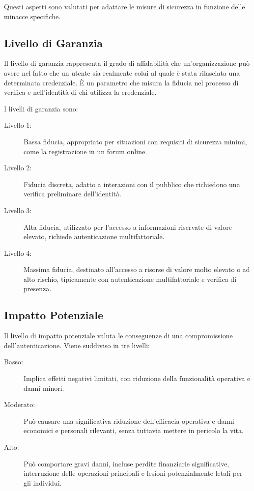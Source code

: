 Questi aspetti sono valutati per adattare le misure di sicurezza in funzione delle minacce specifiche.

\subsection{Livello di Garanzia}

Il livello di garanzia rappresenta il grado di affidabilità che un'organizzazione può avere nel fatto che un utente sia realmente colui al quale è stata rilasciata una determinata credenziale. È un parametro che misura la fiducia nel processo di verifica e nell'identità di chi utilizza la credenziale.

I livelli di garanzia sono:

\begin{description}
    \item[Livello 1:] Bassa fiducia, appropriato per situazioni con requisiti di sicurezza minimi, come la registrazione in un forum online.
    \item[Livello 2:] Fiducia discreta, adatto a interazioni con il pubblico che richiedono una verifica preliminare dell'identità.
    \item[Livello 3:] Alta fiducia, utilizzato per l'accesso a informazioni riservate di valore elevato, richiede autenticazione multifattoriale.
    \item[Livello 4:] Massima fiducia, destinato all'accesso a risorse di valore molto elevato o ad alto rischio, tipicamente con autenticazione multifattoriale e verifica di presenza.
\end{description}

\subsection{Impatto Potenziale}

Il livello di impatto potenziale valuta le conseguenze di una compromissione dell'autenticazione. Viene suddiviso in tre livelli:

\begin{description}
    \item[Basso:] Implica effetti negativi limitati, con riduzione della funzionalità operativa e danni minori.
    \item[Moderato:] Può causare una significativa riduzione dell'efficacia operativa e danni economici e personali rilevanti, senza tuttavia mettere in pericolo la vita.
    \item[Alto:] Può comportare gravi danni, incluse perdite finanziarie significative, interruzione delle operazioni principali e lesioni potenzialmente letali per gli individui.
\end{description}

